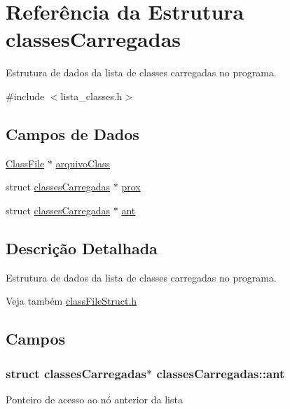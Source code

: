 \hypertarget{structclassesCarregadas}{}\section{Referência da Estrutura classes\+Carregadas}
\label{structclassesCarregadas}


Estrutura de dados da lista de classes carregadas no programa.  




{\ttfamily \#include $<$lista\+\_\+classes.\+h$>$}

\subsection*{Campos de Dados}
\begin{DoxyCompactItemize}
\item 
\hyperlink{classFileStruct_8h_aed419e54ca9f7e5ab3b22a3036af9993}{Class\+File} $\ast$ \hyperlink{structclassesCarregadas_a0bd56a3a1fe9cef7e3cd63a947cb2edb}{arquivo\+Class}
\item 
struct \hyperlink{structclassesCarregadas}{classes\+Carregadas} $\ast$ \hyperlink{structclassesCarregadas_a9be874f129111fad8157f3e4205e9e98}{prox}
\item 
struct \hyperlink{structclassesCarregadas}{classes\+Carregadas} $\ast$ \hyperlink{structclassesCarregadas_a2a075e91c50be2dbf5218507e5043a8e}{ant}
\end{DoxyCompactItemize}


\subsection{Descrição Detalhada}
Estrutura de dados da lista de classes carregadas no programa. 

\begin{DoxySeeAlso}{Veja também}
\hyperlink{classFileStruct_8h}{class\+File\+Struct.\+h} 
\end{DoxySeeAlso}


\subsection{Campos}
\subsubsection[{\texorpdfstring{ant}{ant}}]{\setlength{\rightskip}{0pt plus 5cm}struct {\bf classes\+Carregadas}$\ast$ classes\+Carregadas\+::ant}\hypertarget{structclassesCarregadas_a2a075e91c50be2dbf5218507e5043a8e}{}\label{structclassesCarregadas_a2a075e91c50be2dbf5218507e5043a8e}
Ponteiro de acesso ao nó anterior da lista 
